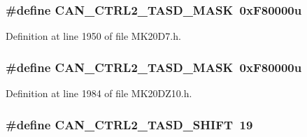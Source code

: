 \subsubsection[{\texorpdfstring{C\+A\+N\+\_\+\+C\+T\+R\+L2\+\_\+\+T\+A\+S\+D\+\_\+\+M\+A\+SK}{CAN_CTRL2_TASD_MASK}}]{\setlength{\rightskip}{0pt plus 5cm}\#define C\+A\+N\+\_\+\+C\+T\+R\+L2\+\_\+\+T\+A\+S\+D\+\_\+\+M\+A\+SK~0x\+F80000u}\hypertarget{group___c_a_n___register___masks_ga50bd2b3ca86be2357515614d717e8167}{}\label{group___c_a_n___register___masks_ga50bd2b3ca86be2357515614d717e8167}


Definition at line 1950 of file M\+K20\+D7.\+h.

\subsubsection[{\texorpdfstring{C\+A\+N\+\_\+\+C\+T\+R\+L2\+\_\+\+T\+A\+S\+D\+\_\+\+M\+A\+SK}{CAN_CTRL2_TASD_MASK}}]{\setlength{\rightskip}{0pt plus 5cm}\#define C\+A\+N\+\_\+\+C\+T\+R\+L2\+\_\+\+T\+A\+S\+D\+\_\+\+M\+A\+SK~0x\+F80000u}\hypertarget{group___c_a_n___register___masks_ga50bd2b3ca86be2357515614d717e8167}{}\label{group___c_a_n___register___masks_ga50bd2b3ca86be2357515614d717e8167}


Definition at line 1984 of file M\+K20\+D\+Z10.\+h.

\subsubsection[{\texorpdfstring{C\+A\+N\+\_\+\+C\+T\+R\+L2\+\_\+\+T\+A\+S\+D\+\_\+\+S\+H\+I\+FT}{CAN_CTRL2_TASD_SHIFT}}]{\setlength{\rightskip}{0pt plus 5cm}\#define C\+A\+N\+\_\+\+C\+T\+R\+L2\+\_\+\+T\+A\+S\+D\+\_\+\+S\+H\+I\+FT~19}\hypertarget{group___c_a_n___register___masks_gac9265ea7ee9b07803fdb62c92aa85ea0}{}\label{group___c_a_n___register___masks_gac9265ea7ee9b07803fdb62c92aa85ea0}


